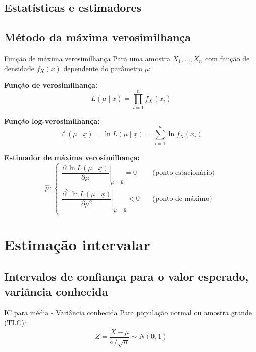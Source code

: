 \documentclass[a4paper,12pt]{article}
\begin{document}
\subsection{Estatísticas e estimadores}

\subsection{Método da máxima verosimilhança}

\begin{formulabox}{Função de máxima verosimilhança}
Para uma amostra $X_1, \ldots, X_n$ com função de densidade $f_X(x)$ dependente do parâmetro $\mu$:

\textbf{Função de verosimilhança:}
\begin{equation}\label{formula23}\tag{Fórmula 23}
    L(\mu\mid \underline{x}) = \prod_{i=1}^n f_X(x_i)
\end{equation}

\textbf{Função log-verosimilhança:}
\begin{equation*}
    \ell(\mu\mid \underline{x}) = \ln L(\mu\mid \underline{x}) = \sum_{i=1}^n \ln f_X(x_i)
\end{equation*}

\textbf{Estimador de máxima verosimilhança:}
\[
    \hat{\mu} : 
    \begin{cases}
        \left. \dfrac{\partial\, \ln L(\mu \mid \underline{x})}{\partial \mu} \right|_{\mu = \hat{\mu}} = 0 \quad &\text{(ponto estacionário)} \\[2ex]
        \left. \dfrac{\partial^2\, \ln L(\mu \mid \underline{x})}{\partial \mu^2} \right|_{\mu = \hat{\mu}} < 0 \quad &\text{(ponto de máximo)}
    \end{cases}
\]
\end{formulabox}

\newpage

\section{\color{sectioncolor}Estimação intervalar}
\subsection{Intervalos de confiança para o valor esperado, variância conhecida}

\begin{formulabox}{IC para média - Variância conhecida}
Para população normal ou amostra grande (TLC):
\begin{equation}\label{formula24}\tag{Fórmula 24}
    Z = \frac{\overline{X} - \mu}{\sigma/\sqrt{n}} \sim N(0,1)
\end{equation}
\end{formulabox}
\end{document}
